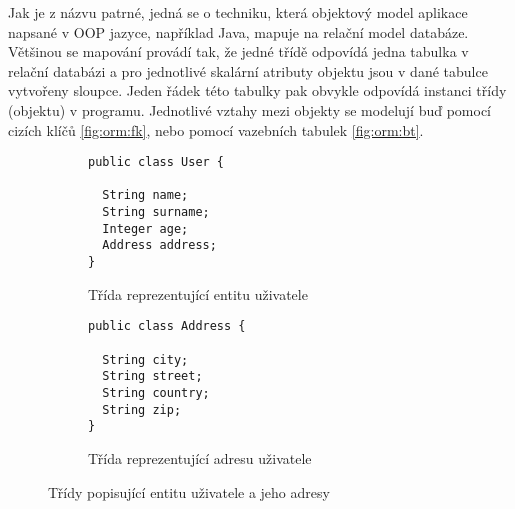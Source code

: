 Jak je z názvu patrné, jedná se o techniku, která objektový model aplikace napsané v OOP jazyce, například Java, mapuje na relační model databáze. Většinou se mapování provádí tak, že jedné třídě odpovídá jedna tabulka v relační databázi a pro jednotlivé skalární atributy objektu jsou v dané tabulce vytvořeny sloupce. Jeden řádek této tabulky pak obvykle odpovídá instanci třídy (objektu) v programu. Jednotlivé vztahy mezi objekty se modelují buď pomocí cizích klíčů \ref{fig:orm:fk}, nebo pomocí vazebních tabulek \ref{fig:orm:bt}.

\begin{figure}[!h]
\begin{subfigure}[b]{0.45\textwidth}
\caption{Třída reprezentující entitu uživatele}
\label{code:java:user}
\centering
\begin{lstlisting}
public class User {

  String name;
  String surname;
  Integer age;
  Address address;
}
\end{lstlisting}
\end{subfigure}
\begin{subfigure}[b]{0.45\textwidth}
\caption{Třída reprezentující adresu uživatele}
\centering
\begin{lstlisting}
public class Address {

  String city;
  String street;
  String country;
  String zip;
}
\end{lstlisting}
\end{subfigure}
\caption{Třídy popisující entitu uživatele a jeho adresy}\label{fig:orm:class}
\end{figure}

